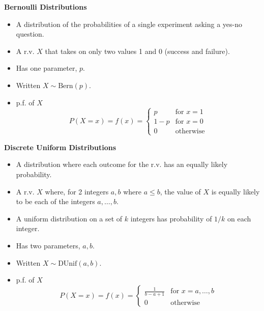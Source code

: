 \documentclass[11pt]{article}
\begin{document}
\textbf{Bernoulli Distributions}
\begin{itemize}
    \item A distribution of the probabilities of a single experiment asking a yes-no question.
    \item A r.v. $X$ that takes on only two values 1 and 0 (success and failure).
    \item Has one parameter, $p$.
    \item Written $X \sim \text{Bern}(p)$.
    \item p.f. of $X$
    \[ P(X=x) = f(x) = \begin{cases} 
        p & \text{for } x=1 \\
        1-p & \text{for } x=0 \\
        0 & \text{otherwise}
     \end{cases}
  \]
\end{itemize}

\textbf{Discrete Uniform Distributions}
\begin{itemize}
    \item A distribution where each outcome for the r.v. has an equally likely probability.
    \item A r.v. $X$ where, for 2 integers $a,b$ where $a \le b$, the value of $X$ is equally 
    likely to be each of the integers $a, \ldots, b$.
    \item A uniform distribution on a set of $k$ integers has probability of $1/k$ on each 
    integer.
    \item Has two parameters, $a,b$.
    \item Written $X \sim \text{DUnif}(a,b)$.
    \item p.f. of $X$
    \[ P(X=x) = f(x) = \begin{cases} 
        \frac{1}{b-a+1} & \text{for } x=a, \ldots, b \\
        0 & \text{otherwise}
     \end{cases}
  \]
\end{itemize}
\end{document}
